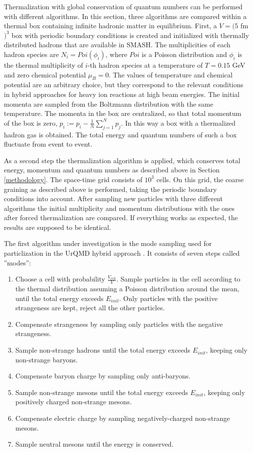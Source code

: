 Thermalization with global conservation of quantum numbers can be performed
with different algorithms. In this section, three algorithms are compared within
a thermal box containing infinite hadronic matter in equilibrium. First,
a $V = (5$ fm$)^3$ box with periodic boundary conditions is created and initialized
with thermally distributed hadrons that are available in SMASH. The multiplicities
of each hadron species are $N_i = Poi(\phi_i)$, where $Poi$ is a Poisson
distribution and $\phi_i$ is the thermal multiplicity of $i$-th hadron species
at a temperature of $T = 0.15$ GeV and zero chemical potential $\mu_B = 0$. The
values of temperature and chemical potential are an arbitrary choice, but they
correspond to the relevant conditions in hybrid approaches for heavy ion
reactions at high beam energies. The initial momenta are sampled from the
Boltzmann distribution with the same temperature. The momenta in the box are
centralized, so that total momentum of the box is zero, $p_i := p_i -
\frac{1}{N}\sum_{j=1}^N p_j$. In this way a box with a thermalized
hadron gas is obtained. The total energy and quantum numbers of such a box fluctuate
from event to event.

As a second step the thermalization algorithm is applied, which conserves total
energy, momentum and quantum numbers as described above in Section
\ref{methodology}. The space-time grid consists of $10^3$ cells. On this grid,
the coarse graining as described above is performed, taking the periodic
boundary conditions into account. After sampling new particles with three
different algorithms the initial multiplicity and momentum distributions with
the ones after forced thermalization are compared. If everything works as
expected, the results are supposed to be identical.

The first algorithm under investigation is the mode sampling used for
particlization in the UrQMD hybrid approach \cite{Huovinen:2012is}. It consists
of seven steps called ''modes'':
\begin{enumerate}
  \item Choose a cell with probability $\frac{V_{cell}}{V}$. Sample particles
        in the cell according to the thermal distribution assuming a Poisson
        distribution around the mean, until the total energy exceeds $E_{init}$. Only
        particles with the positive strangeness are kept, reject all the other
        particles.
  \item Compensate strangeness by sampling only particles with the negative strangeness.
  \item Sample non-strange hadrons until the total energy exceeds $E_{init}$,
        keeping only non-strange baryons.
  \item Compensate baryon charge by sampling only anti-baryons.
  \item Sample non-strange mesons until the total energy exceeds $E_{init}$,
        keeping only positively charged non-strange mesons.
  \item Compensate electric charge by sampling negatively-charged non-strange mesons.
  \item Sample neutral mesons until the energy is conserved.
\end{enumerate}

